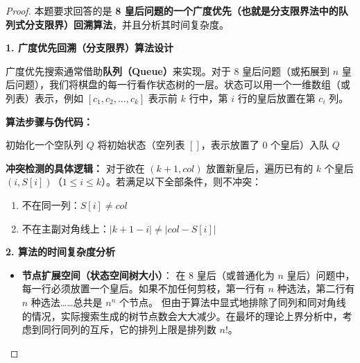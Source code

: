 \documentclass[11pt, a4paper]{article}
\begin{document}
\begin{proof}
    本题要求回答的是 \textbf{8 皇后问题的一个广度优先（也就是分支限界法中的队列式分支限界）回溯算法}，并且分析其时间复杂度。

    \textbf{1. 广度优先回溯（分支限界）算法设计}

    广度优先搜索通常借助\textbf{队列（Queue）}来实现。对于 8 皇后问题（或拓展到 $n$ 皇后问题），我们将棋盘的每一行看作状态树的一层。状态可以用一个一维数组（或列表）表示，例如 $[c_1, c_2, \dots, c_k]$ 表示前 $k$ 行中，第 $i$ 行的皇后放置在第 $c_i$ 列。

    \textbf{算法步骤与伪代码：}

    \begin{algorithm}[H]
    \caption{8 皇后问题的广度优先回溯算法}
    
    初始化一个空队列 $Q$\;
    将初始状态（空列表 $[]$，表示放置了 0 个皇后）入队 $Q$\;
    
    \end{algorithm}

    \textbf{冲突检测的具体逻辑：}
    对于欲在 $(k+1, col)$ 放置新皇后，遍历已有的 $k$ 个皇后 $(i, S[i])$（$1 \le i \le k$）。若满足以下全部条件，则不冲突：
    \begin{enumerate}
        \item 不在同一列：$S[i] \neq col$
        \item 不在主副对角线上：$|k + 1 - i| \neq |col - S[i]|$
    \end{enumerate}

    \textbf{2. 算法的时间复杂度分析}

    \begin{itemize}
        \item \textbf{节点扩展空间（状态空间树大小）}：
        在 8 皇后（或普通化为 $n$ 皇后）问题中，每一行必须放置一个皇后。如果不加任何剪枝，第一行有 $n$ 种选法，第二行有 $n$ 种选法……总共是 $n^n$ 个节点。
        但由于算法中显式地排除了同列和同对角线的情况，实际搜索生成的树节点数会大大减少。在最坏的理论上界分析中，考虑到同行同列的互斥，它的排列上限是排列数 $n!$。
        

\end{itemize}
\end{proof}
\end{document}
